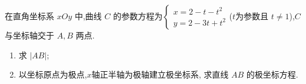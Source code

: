 \documentclass[class=ctexart,crop=false]{standalone}
\begin{document}
在直角坐标系 $xOy$ 中,曲线 $C$ 的参数方程为$\begin{cases}
    x=2-t-t^2\\
    y=2-3t+t^2
\end{cases}$($t$为参数且 $t \neq 1$),$C$ 与坐标轴交于 $A,B$ 两点.
\begin{enumerate}[label=(\arabic*)]
    \item 求 $|AB|;$
    \item 以坐标原点为极点,$x$轴正半轴为极轴建立极坐标系,
    求直线 $AB$ 的极坐标方程.
\end{enumerate}
\end{document}
